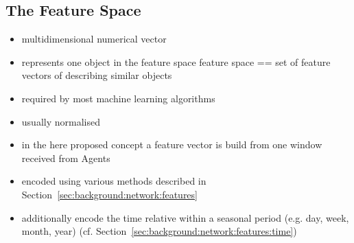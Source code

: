 \subsection{The Feature Space}
\label{sec:concept:anal:feature-vector}

\begin{itemize}
	\item multidimensional numerical vector
	\item represents one object in the feature space
		\subitem feature space == set of feature vectors of describing similar objects
	\item required by most machine learning algorithms
	\item usually normalised
	
	\item in the here proposed concept a feature vector is build from one window received from Agents
	\item encoded using various methods described in Section~\ref{sec:background:network:features}
	\item additionally encode the time relative within a seasonal period (e.g. day, week, month, year) (cf. Section~\ref{sec:background:network:features:time})
	

\end{itemize}
